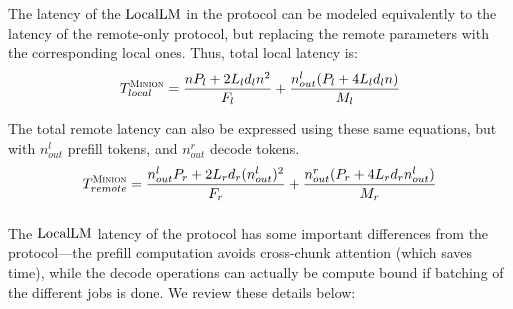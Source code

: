 \subsubsection{\naive}
The latency of the $\mathrm{LocalLM}$ in the \naive protocol can be modeled equivalently to the latency of the remote-only protocol, but replacing the remote parameters with the corresponding local ones.
Thus, total local latency is:
    $$T_{local}^{\textsc{Minion}} = \frac{nP_l + 2 L_l d_l n^2}{F_l} + \frac{n_{out}^l (P_l + 4 L_l d_l n )}{M_l}$$

The total remote latency can also be expressed using these same equations, but with $n_{out}^l$ prefill tokens, and $n_{out}^r$ decode tokens.
$$T_{remote}^{\textsc{Minion}} = \frac{n_{out}^l P_r + 2 L_r d_r (n_{out}^l)^2}{F_r} + \frac{n_{out}^r (P_r + 4 L_r d_r n_{out}^l )}{M_r}$$

\subsubsection{\system}
The $\mathrm{LocalLM}$ latency of the \system protocol has some important differences from the \naive protocol---the prefill computation avoids cross-chunk attention (which saves time), while the decode operations can actually be compute bound if batching of the different jobs is done.
We review these details below:

